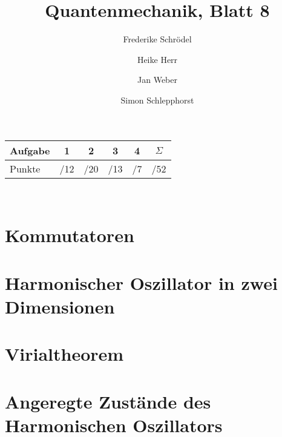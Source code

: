 \documentclass[11pt, ngerman, fleqn, DIV=15, headinclude]{scrartcl}
\title{Quantenmechanik, Blatt 8}
\author{
    Frederike Schrödel \and Heike Herr \and Jan Weber \and Simon Schlepphorst
}
\begin{document}
\maketitle
\begin{center}
	\begin{tabular}{l|c|c|c|c|c}
		Aufgabe &1&2&3&4&$\Sigma$\\
		\hline
		Punkte &\quad /12 & \quad /20 & \quad /13 & \quad /7 & \quad /52
	\end{tabular}\\
\end{center}

\section{Kommutatoren}

\section{Harmonischer Oszillator in zwei Dimensionen}

\section{Virialtheorem}

\section{Angeregte Zustände des Harmonischen Oszillators}
\end{document}
